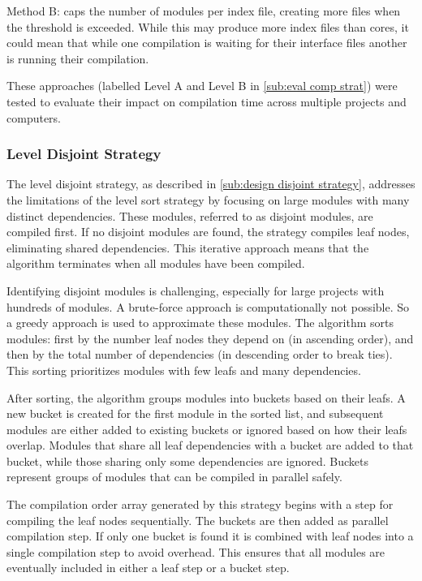 Method B: caps the number of modules per index file, creating more files when
the threshold is exceeded. While this may produce more index files than cores,
it could mean that while one compilation is waiting for their interface files
another is running their compilation. 

These approaches (labelled Level A and Level B in \cref{sub:eval comp strat})
were tested to evaluate their impact on compilation time across multiple
projects and computers.

\subsubsection{Level Disjoint Strategy} \label{sub:imp disj strategy}

The level disjoint strategy, as described in \cref{sub:design disjoint strategy}, addresses the limitations of the level sort strategy by focusing on
large modules with many distinct dependencies. These modules, referred to as
disjoint modules, are compiled first. If no disjoint modules are found, the
strategy compiles leaf nodes, eliminating shared dependencies. This iterative
approach means that the algorithm terminates when all modules have been
compiled.


Identifying disjoint modules is challenging, especially for large projects with
hundreds of modules. A brute-force approach is computationally not possible. So
a greedy approach is used to approximate these modules. The algorithm sorts
modules: first by the number leaf nodes they depend on (in ascending order),
and then by the total number of dependencies (in descending order to break
ties). This sorting prioritizes modules with few leafs and  many dependencies.

After sorting, the algorithm groups modules into buckets based on their leafs.
A new bucket is created for the first module in the sorted list, and subsequent
modules are either added to existing buckets or ignored based on how their
leafs overlap. Modules that share all leaf dependencies with a bucket are added
to that bucket, while those sharing only some dependencies are ignored. Buckets
represent groups of modules that can be compiled in parallel safely.

The compilation order array generated by this strategy begins with a step for
compiling the leaf nodes sequentially. The buckets are then added as parallel
compilation step. If only one bucket is found it is combined with leaf nodes
into a single compilation step to avoid overhead. This ensures that all
modules are eventually included in either a leaf step or a bucket step.

